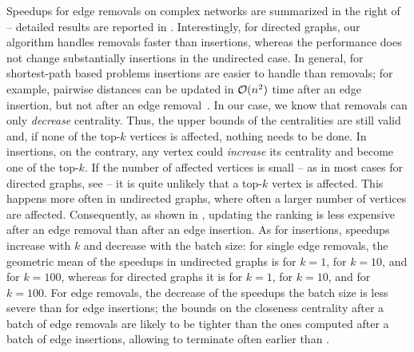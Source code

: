 Speedups for edge removals on complex networks are summarized in the right of
 --
detailed results are reported in
.
Interestingly, for directed graphs, our algorithm handles removals faster than
insertions, whereas the performance does not change substantially \wrt insertions
in the undirected case. In general, for shortest-path based problems insertions
are easier to handle than removals; for example, pairwise distances can be
updated in $\mathcal{O}(n^2)$ time after an edge insertion, but not after an edge
removal~\cite{DBLP:journals/jacm/DemetrescuI04}. In our case, we know that
removals can only \emph{decrease} centrality. Thus, the upper bounds
of the centralities are still valid and, if none of the top-$k$ vertices
is affected, nothing needs to be done.
In insertions, on the contrary, any vertex could \emph{increase} its centrality
and become one of the top-$k$.
If the number of affected vertices is small -- as in most cases for directed graphs,
see  -- it is quite unlikely that a top-$k$
vertex is affected. This happens more often in undirected graphs, where often a larger
number of vertices are affected. Consequently, as shown in
,
updating the ranking is less expensive after an edge removal than after an edge
insertion.
%
As for insertions, speedups increase with $k$ and decrease with the batch
size: for single edge removals, the geometric mean of the speedups in
undirected graphs is \speedupComplexUndRemovalKOneBOne for $k=1$,
\speedupComplexUndRemovalKTenBOne for $k=10$, and
\speedupComplexUndRemovalKHundredBOne for $k=100$, whereas for directed graphs
it is \speedupComplexDirRemovalKOneBOne for $k=1$,
\speedupComplexDirRemovalKTenBOne for $k=10$, and
\speedupComplexDirRemovalKHundredBOne for $k=100$.
%
For edge removals, the decrease of the speedups \wrt the batch size is less severe
than for edge insertions; the bounds on the
closeness centrality after a batch of edge removals are likely to be tighter than the ones
computed after a batch of edge insertions, allowing  to terminate
often earlier than .


